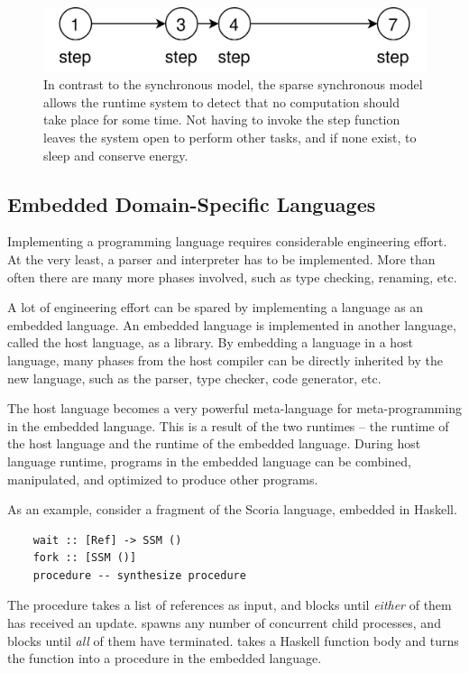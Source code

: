 \begin{figure}
    \centering
    \includegraphics[scale=0.2]{graphics/sparse-clock.png}
    \caption{In contrast to the synchronous model, the sparse synchronous model allows the runtime system to
    detect that no computation should take place for some time. Not having to invoke the step function
    leaves the system open to perform other tasks, and if none exist, to sleep and conserve energy.}
    \label{graphics:sparse-clock}
\end{figure}

\subsection{Embedded Domain-Specific Languages}

Implementing a programming language requires considerable engineering effort. At the very least, a parser and interpreter
has to be implemented. More than often there are many more phases involved, such as type checking, renaming, etc.

A lot of engineering effort can be spared by implementing a language as an embedded language. An embedded language is implemented in another language, called the host language, as a library. By embedding a language in a host language, many phases from the host
compiler can be directly inherited by the new language, such as the parser, type checker, code generator, etc.

The host language becomes a very powerful meta-language for meta-programming in the embedded language. This is a
result of the two runtimes -- the runtime of the host language and the runtime of the embedded language. During host language
runtime, programs in the embedded language can be combined, manipulated, and optimized to produce other programs.

As an example, consider a fragment of the Scoria language, embedded in Haskell.

\begin{verbatim}
    wait :: [Ref] -> SSM ()
    fork :: [SSM ()]
    procedure -- synthesize procedure
\end{verbatim}

The  procedure takes a list of references as input, and blocks until \textit{either} of them has received an update.
 spawns any number of concurrent child processes, and blocks until \textit{all} of them have terminated.
 takes a Haskell function body and turns the function into a procedure in the embedded language.

